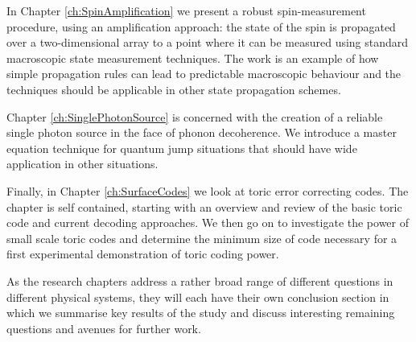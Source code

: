 In Chapter \ref{ch:SpinAmplification} we present a robust spin-measurement procedure, using an amplification approach: the state of the spin is propagated over a two-dimensional array to a point where it can be measured using standard macroscopic state measurement techniques. The work is an example of how simple propagation rules can lead to predictable macroscopic behaviour and the techniques should be applicable in other state propagation schemes.

Chapter \ref{ch:SinglePhotonSource} is concerned with the creation of a reliable single photon source in the face of phonon decoherence. We introduce a master equation technique for quantum jump situations that should have wide application in other situations.

Finally, in Chapter \ref{ch:SurfaceCodes} we look at toric error correcting codes. The chapter is self contained, starting with an overview and review of the basic toric code and current decoding approaches. We then go on to investigate the power of small scale toric codes and determine the minimum size of code necessary for a first experimental demonstration of toric coding power.

As the research chapters address a rather broad range of different questions in different physical systems, they will each have their own conclusion section in which we summarise key results of the study and discuss interesting remaining questions and avenues for further work.


